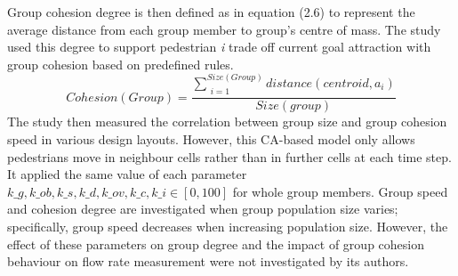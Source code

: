 \documentclass[a4paper,11pt,phdthesis,singlespace,twoside]{cssethesis}
\begin{document}
Group cohesion degree is then defined as in equation (2.6) to represent the average distance from each group member to group's centre of mass. The study used this degree to support pedestrian \textit{i} trade off current goal attraction with group cohesion based on predefined rules.
\begin{equation}
Cohesion(Group)= \frac{\sum_{\substack{i=1}}^{Size(Group)}distance(centroid,a_{i})}{Size(group)}
\end{equation}
The study then measured the correlation between group size and group cohesion speed in various design layouts. However, this CA-based model only allows pedestrians move in neighbour cells rather than in further cells at each time step. It applied the same value of each parameter \begin{math} \textit{k_{g}}, \textit{k_{ob}}, \textit{k_{s}},\textit{k_{d}},\textit{k_{ov}},\textit{k_{c}},\textit{k_{i}}  \in [0,100] \end{math} for whole group members. Group speed and cohesion degree are investigated when group population size varies; specifically, group speed decreases when increasing population size. However, the effect of these parameters on group degree and the impact of group cohesion behaviour on flow rate measurement were not investigated by its authors.
\end{document}
